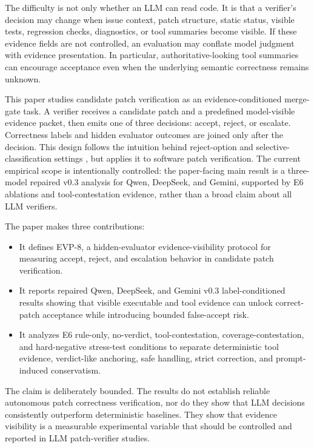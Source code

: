 \documentclass[conference]{IEEEtran}
\begin{document}
The difficulty is not only whether an LLM can read code. It is that a verifier's decision may change when issue context, patch structure, static status, visible tests, regression checks, diagnostics, or tool summaries become visible. If these evidence fields are not controlled, an evaluation may conflate model judgment with evidence presentation. In particular, authoritative-looking tool summaries can encourage acceptance even when the underlying semantic correctness remains unknown.

This paper studies candidate patch verification as an evidence-conditioned merge-gate task. A verifier receives a candidate patch and a predefined model-visible evidence packet, then emits one of three decisions: accept, reject, or escalate. Correctness labels and hidden evaluator outcomes are joined only after the decision. This design follows the intuition behind reject-option and selective-classification settings \cite{chow_tit_1970_reject_option,cortes_jmlr_2016_reject_option,geifman_el_yaniv_2017_selective_classification}, but applies it to software patch verification. The current empirical scope is intentionally controlled: the paper-facing main result is a three-model repaired v0.3 analysis for Qwen, DeepSeek, and Gemini, supported by E6 ablations and tool-contestation evidence, rather than a broad claim about all LLM verifiers.

The paper makes three contributions:

\begin{itemize}
\item It defines EVP-8, a hidden-evaluator evidence-visibility protocol for measuring accept, reject, and escalation behavior in candidate patch verification.
\item It reports repaired Qwen, DeepSeek, and Gemini v0.3 label-conditioned results showing that visible executable and tool evidence can unlock correct-patch acceptance while introducing bounded false-accept risk.
\item It analyzes E6 rule-only, no-verdict, tool-contestation, coverage-contestation, and hard-negative stress-test conditions to separate deterministic tool evidence, verdict-like anchoring, safe handling, strict correction, and prompt-induced conservatism.
\end{itemize}

The claim is deliberately bounded. The results do not establish reliable autonomous patch correctness verification, nor do they show that LLM decisions consistently outperform deterministic baselines. They show that evidence visibility is a measurable experimental variable that should be controlled and reported in LLM patch-verifier studies.
\end{document}
